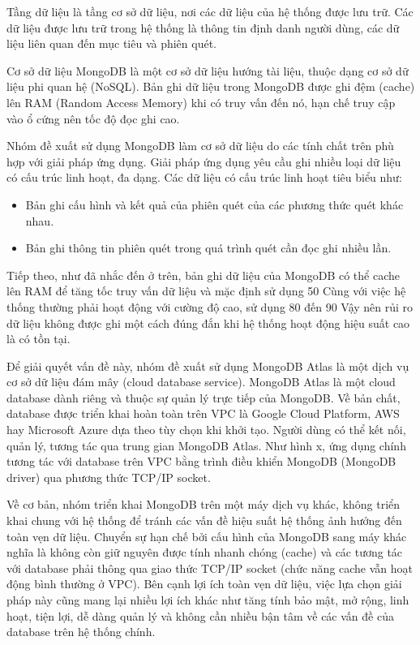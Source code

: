 \tab Tầng dữ liệu là tầng cơ sở dữ liệu, nơi các dữ liệu của hệ thống được lưu trữ.
Các dữ liệu được lưu trữ trong hệ thống là thông tin định danh người dùng, các dữ liệu liên quan đến mục tiêu và phiên quét.
\par

Cơ sở dữ liệu MongoDB là một cơ sở dữ liệu hướng tài liệu, thuộc dạng cơ sở dữ liệu phi quan hệ (NoSQL).
Bản ghi dữ liệu trong MongoDB được ghi đệm (cache) lên RAM (Random Access Memory) khi có truy vấn đến nó, hạn chế truy cập vào ổ cứng nên tốc độ đọc ghi cao.
\par

Nhóm đề xuất sử dụng MongoDB làm cơ sở dữ liệu do các tính chất trên phù hợp với giải pháp ứng dụng.
Giải pháp ứng dụng yêu cầu ghi nhiều loại dữ liệu có cấu trúc linh hoạt, đa dạng.
Các dữ liệu có cấu trúc linh hoạt tiêu biểu như:

\begin{itemize}
    \item Bản ghi cấu hình và kết quả của phiên quét của các phương thức quét khác nhau.
    \item Bản ghi thông tin phiên quét trong quá trình quét cần đọc ghi nhiều lần.
\end{itemize}

Tiếp theo, như đã nhắc đến ở trên, bản ghi dữ liệu của MongoDB có thể cache lên RAM để tăng tốc truy vấn dữ liệu và mặc định sử dụng 50%
Cùng với việc hệ thống thường phải hoạt động với cường độ cao, sử dụng 80 đến 90%
Vậy nên rủi ro dữ liệu không được ghi một cách đúng đắn khi hệ thống hoạt động hiệu suất cao là có tồn tại.
\par

Để giải quyết vấn đề này, nhóm đề xuất sử dụng MongoDB Atlas là một dịch vụ cơ sở dữ liệu đám mây (cloud database service).
MongoDB Atlas là một cloud database dành riêng và thuộc sự quản lý trực tiếp của MongoDB.
Về bản chất, database được triển khai hoàn toàn trên VPC là Google Cloud Platform, AWS hay Microsoft Azure dựa theo tùy chọn khi khởi tạo.
Người dùng có thể kết nối, quản lý, tương tác qua trung gian MongoDB Atlas.
Như hình x, ứng dụng chính tương tác với database trên VPC bằng trình điều khiển MongoDB (MongoDB driver) qua phương thức TCP/IP socket.
\par

Về cơ bản, nhóm triển khai MongoDB trên một máy dịch vụ khác, không triển khai chung với hệ thống để tránh các vấn đề hiệu suất hệ thống ảnh hưởng đến toàn vẹn dữ liệu.
Chuyển sự hạn chế bởi cấu hình của MongoDB sang máy khác nghĩa là không còn giữ nguyên được tính nhanh chóng (cache) và các tương tác với database phải thông qua giao thức TCP/IP socket (chức năng cache vẫn hoạt động bình thường ở VPC).
Bên cạnh lợi ích toàn vẹn dữ liệu, việc lựa chọn giải pháp này cũng mang lại nhiều lợi ích khác như tăng tính bảo mật, mở rộng, linh hoạt, tiện lợi, dễ dàng quản lý và không cần nhiều bận tâm về các vấn đề của database trên hệ thống chính.

